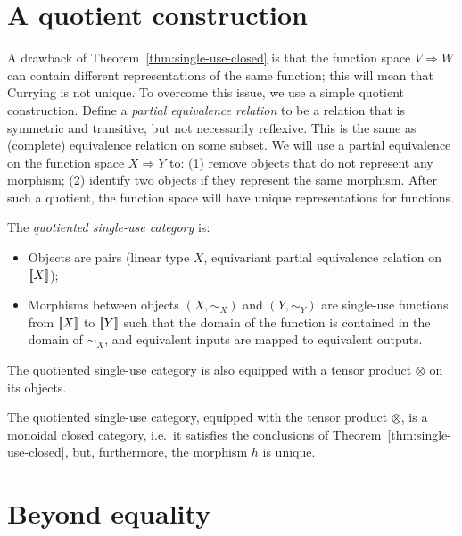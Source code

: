 \documentclass[10pt,a4paper]{amsart}
\numberwithin{equation}{section}
\theoremstyle{plain}
\newcommand{\sem}[1]{[{\kern-0.45ex}[#1]{\kern-0.45ex}]}
\newcommand{\funspace}[2]{#1 \Rightarrow #2}
\begin{document}
\section{A quotient construction}
\label{sec:quotient-category}
A drawback of Theorem~\ref{thm:single-use-closed} is that the function space $\funspace V W$ can contain different representations of the same function; this will mean that Currying is not unique. To overcome this issue, we use a simple quotient construction. 
Define a \emph{partial equivalence relation} to be a relation that is symmetric and transitive, but not necessarily reflexive.  This is the same as (complete) equivalence relation on some subset. We will use a partial equivalence on the function space $X \Rightarrow Y$ to: (1)
 remove objects that do not represent any morphism; (2) identify two objects if they represent the same morphism. After such a quotient, the function space will have unique representations for functions. 




\begin{definition}
    The \emph{quotiented single-use category} is: 
    \begin{itemize}
    \item Objects are pairs (linear type $X$, equivariant partial equivalence relation on $\sem X$);
    \item Morphisms between objects $(X,\sim_X)$ and $(Y,\sim_Y)$ are single-use functions from $\sem X$ to $\sem Y$ such that the domain of the function is contained in the domain of $\sim_X$, and equivalent inputs are mapped to equivalent outputs.
    \end{itemize}
\end{definition}

The quotiented single-use category is also equipped with a tensor product $\otimes$ on its objects.

\begin{theorem}
    The quotiented single-use category, equipped with the tensor product $\otimes$, is a monoidal closed category, i.e.~it satisfies the conclusions of Theorem~\ref{thm:single-use-closed}, but, furthermore, the morphism $h$ is unique.
\end{theorem}



\section{Beyond equality}
\label{sec:beyond-equality-appendix}
\end{document}
